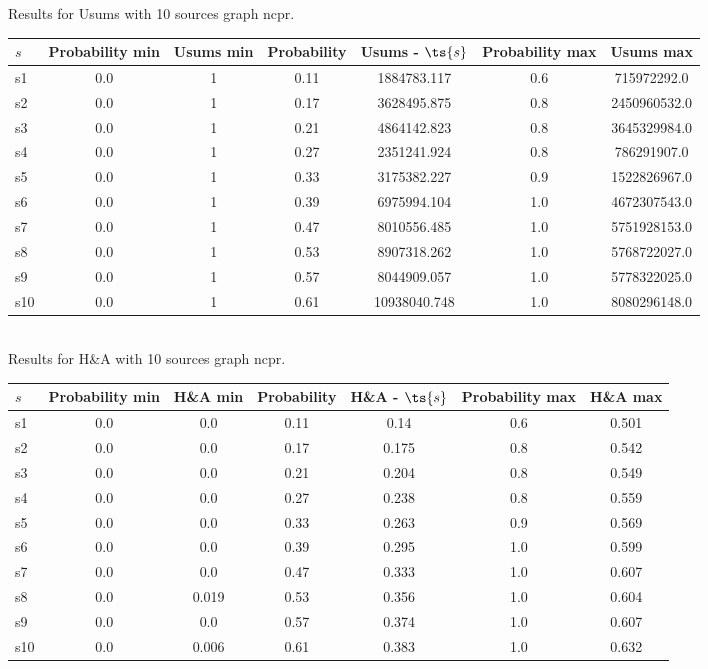 \documentclass{article}
\begin{document}
\noindent Results for Usums with 10 sources graph ncpr.

\noindent\begin{tabular}{|l|c|c|c|c|c|c|}
\hline
$s$& Probability min & Usums min & Probability & Usums - $\ts{s}$ & Probability max & Usums max\\
\hline
s1 &0.0 & 1 & 0.11 & 1884783.117 & 0.6 & 715972292.0\\
\hline
s2 &0.0 & 1 & 0.17 & 3628495.875 & 0.8 & 2450960532.0\\
\hline
s3 &0.0 & 1 & 0.21 & 4864142.823 & 0.8 & 3645329984.0\\
\hline
s4 &0.0 & 1 & 0.27 & 2351241.924 & 0.8 & 786291907.0\\
\hline
s5 &0.0 & 1 & 0.33 & 3175382.227 & 0.9 & 1522826967.0\\
\hline
s6 &0.0 & 1 & 0.39 & 6975994.104 & 1.0 & 4672307543.0\\
\hline
s7 &0.0 & 1 & 0.47 & 8010556.485 & 1.0 & 5751928153.0\\
\hline
s8 &0.0 & 1 & 0.53 & 8907318.262 & 1.0 & 5768722027.0\\
\hline
s9 &0.0 & 1 & 0.57 & 8044909.057 & 1.0 & 5778322025.0\\
\hline
s10 &0.0 & 1 & 0.61 & 10938040.748 & 1.0 & 8080296148.0\\
\hline
\end{tabular}\\

\noindent Results for H\&A with 10 sources graph ncpr.

\noindent\begin{tabular}{|l|c|c|c|c|c|c|}
\hline
$s$& Probability min & H\&A min & Probability & H\&A - $\ts{s}$ & Probability max & H\&A max\\
\hline
s1 &0.0 & 0.0 & 0.11 & 0.14 & 0.6 & 0.501\\
\hline
s2 &0.0 & 0.0 & 0.17 & 0.175 & 0.8 & 0.542\\
\hline
s3 &0.0 & 0.0 & 0.21 & 0.204 & 0.8 & 0.549\\
\hline
s4 &0.0 & 0.0 & 0.27 & 0.238 & 0.8 & 0.559\\
\hline
s5 &0.0 & 0.0 & 0.33 & 0.263 & 0.9 & 0.569\\
\hline
s6 &0.0 & 0.0 & 0.39 & 0.295 & 1.0 & 0.599\\
\hline
s7 &0.0 & 0.0 & 0.47 & 0.333 & 1.0 & 0.607\\
\hline
s8 &0.0 & 0.019 & 0.53 & 0.356 & 1.0 & 0.604\\
\hline
s9 &0.0 & 0.0 & 0.57 & 0.374 & 1.0 & 0.607\\
\hline
s10 &0.0 & 0.006 & 0.61 & 0.383 & 1.0 & 0.632\\
\hline
\end{tabular}\\
\end{document}
